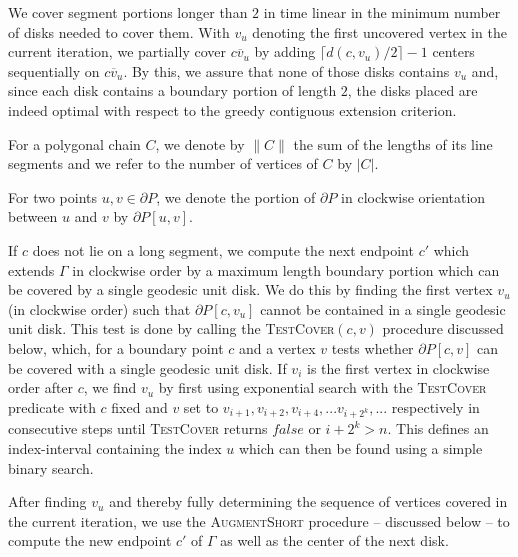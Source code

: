 \documentclass{llncs}
\begin{document}
{We cover segment portions longer than $2$ in time linear in the minimum number of disks needed to cover them. With $v_u$ denoting the first uncovered vertex in the current iteration, we}  partially cover $\overline{cv_u}$ by adding $\lceil d(c, v_u)/2 \rceil - 1$ {centers sequentially on $\overline{cv_u}$}.  By this, we assure that none of  {those disks} contains $v_u$ and, since each disk contains a boundary portion of length $2$, the disks placed are indeed optimal with respect to the greedy contiguous extension criterion.






\begin{definition}
For a polygonal chain $C$, we denote by $\|C\|$ the sum of the lengths of its line segments and we refer to the number of vertices of $C$ by $|C|$.
\end{definition}

\begin{definition}
For two points $u,v \in \partial P$, we denote the portion of $\partial P$ in clockwise orientation between $u$ and $v$ by $\partial P[u,v]$.
\end{definition}



If $c$ does not lie on a long segment, we compute the next endpoint $c'$ which extends $\Gamma$ in clockwise order by a maximum length boundary portion which can be covered by a single geodesic unit disk. We do this   by finding the first vertex $v_u$ (in clockwise order) such that $\partial P[c, v_u]$ cannot be contained in a single geodesic unit disk. This test is done by calling the \textsc{TestCover}$(c,v)$ procedure discussed below, which, for a boundary point $c$ and a vertex $v$ tests whether $\partial P[c, v]$ can be covered with a single geodesic unit disk.  
 {If $v_i$ is the first vertex in clockwise order after $c$, we find $v_u$ by first using exponential search with the \textsc{TestCover} predicate with $c$  fixed and $v$ set to $v_{i+1}, v_{i+2}, v_{i+4}, ... v_{i+2^k}, ...$ respectively in consecutive steps until \textsc{TestCover} returns $false$ or $i + 2^k > n$.} 
This defines an {index}-interval containing {the index} $u$ which can then be found using a simple binary search. 

After finding $v_u$ and thereby fully determining the sequence of vertices covered in the current iteration, we use the \textsc{AugmentShort} procedure -- discussed below -- to compute the new endpoint $c'$ of $\Gamma$ as well as the center of the next disk. \\
\end{document}
